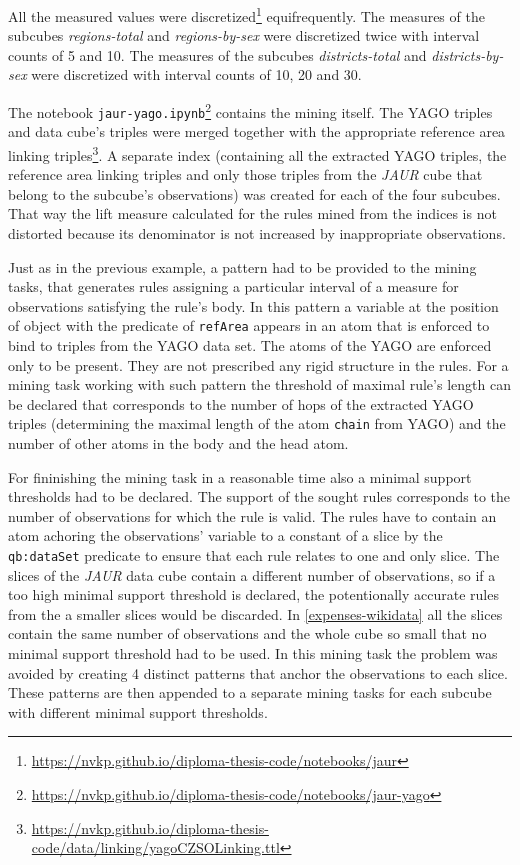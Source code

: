 All the measured values were discretized\footnote{\href{https://nvkp.github.io/diploma-thesis-code/notebooks/jaur}{https://nvkp.github.io/diploma-thesis-code/notebooks/jaur}} equifrequently. The measures of the subcubes \textit{regions-total} and \textit{regions-by-sex} were discretized twice with interval counts of 5 and 10. The measures of the subcubes \textit{districts-total} and \textit{districts-by-sex} were discretized with interval counts of 10, 20 and 30.

The notebook \verb|jaur-yago.ipynb|\footnote{\href{https://nvkp.github.io/diploma-thesis-code/notebooks/jaur-yago}{https://nvkp.github.io/diploma-thesis-code/notebooks/jaur-yago}} contains the mining itself. The YAGO triples and data cube's triples were merged together with the appropriate reference area linking triples\footnote{\href{https://nvkp.github.io/diploma-thesis-code/data/linking/yagoCZSOLinking.ttl}{https://nvkp.github.io/diploma-thesis-code/data/linking/yagoCZSOLinking.ttl}}. A separate index (containing all the extracted YAGO triples, the reference area linking triples and only those triples from the \textit{JAUR} cube that belong to the subcube's observations) was created for each of the four subcubes. That way the lift measure calculated for the rules mined from the indices is not distorted because its denominator is not increased by inappropriate observations.

Just as in the previous example, a pattern had to be provided to the mining tasks, that generates rules assigning a particular interval of a measure for observations satisfying the rule's body. In this pattern a variable at the position of object with the predicate of \verb|refArea| appears in an atom that is enforced to bind to triples from the YAGO data set. The atoms of the YAGO are enforced only to be present. They are not prescribed any rigid structure in the rules. For a mining task working with such pattern the threshold of maximal rule's length can be declared that corresponds to the number of hops of the extracted YAGO triples (determining the maximal length of the atom \verb|chain| from YAGO) and the number of other atoms in the body and the head atom.

For fininishing the mining task in a reasonable time also a minimal support thresholds had to be declared. The support of the sought rules corresponds to the number of observations for which the rule is valid. The rules have to contain an atom achoring the observations' variable to a constant of a slice by the \verb|qb:dataSet| predicate to ensure that each rule relates to one and only slice. The slices of the \textit{JAUR} data cube contain a different number of observations, so if a too high minimal support threshold is declared, the potentionally accurate rules from the a smaller slices would be discarded. In \ref{expenses-wikidata} all the slices contain the same number of observations and the whole cube so small that no minimal support threshold had to be used. In this mining task the problem was avoided by creating 4 distinct patterns that anchor the observations to each slice. These patterns are then appended to a separate mining tasks for each subcube with different minimal support thresholds.

